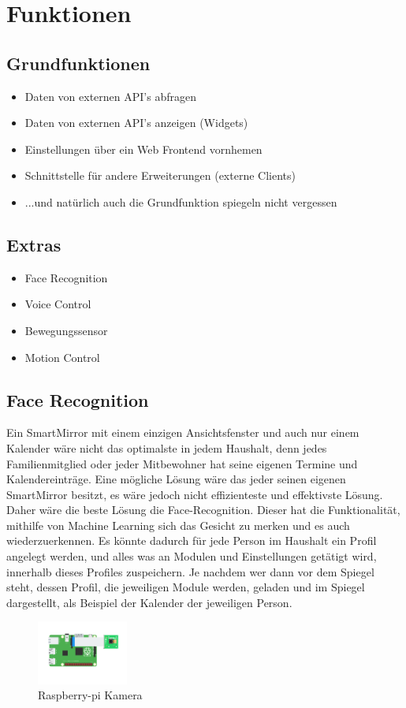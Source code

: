 
\section{Funktionen}\label{Funktionen}
\subsection{Grundfunktionen}
\begin{itemize}
\item Daten von externen API's abfragen
\item Daten von externen API's anzeigen (Widgets)
\item Einstellungen über ein Web Frontend vornhemen
\item Schnittstelle für andere Erweiterungen (externe Clients)
\item ...und natürlich auch die Grundfunktion spiegeln nicht vergessen
\end{itemize}

\subsection{Extras}
\begin{itemize}
\item Face Recognition
\item Voice Control
\item Bewegungssensor
\item Motion Control
\end{itemize}

\subsection{Face Recognition}
Ein SmartMirror mit einem einzigen Ansichtsfenster und auch nur einem Kalender wäre nicht das optimalste in jedem Haushalt, denn jedes Familienmitglied oder jeder Mitbewohner hat seine eigenen Termine und Kalendereinträge. Eine mögliche Lösung wäre das jeder seinen eigenen SmartMirror besitzt, es wäre jedoch nicht effizienteste und effektivste Lösung. Daher wäre die beste Lösung die \dq Face-Recognition\dq. Dieser hat die Funktionalität, mithilfe von Machine Learning sich das Gesicht zu merken und es auch wiederzuerkennen. Es könnte dadurch für jede Person im Haushalt ein Profil angelegt werden, und alles was an Modulen und Einstellungen getätigt wird, innerhalb dieses Profiles zuspeichern. Je nachdem wer dann vor dem Spiegel steht, dessen Profil, die jeweiligen Module werden, geladen und im Spiegel dargestellt, als Beispiel der Kalender der jeweiligen Person. 
\begin{figure}[h]
\includegraphics[width=30mm]{pictures/raspberry-pi-camera-2.png}
\caption{Raspberry-pi Kamera}
\end{figure}

